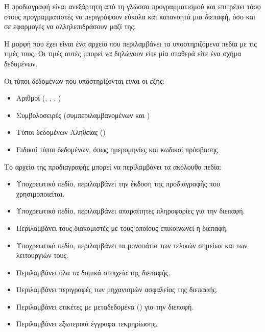Η προδιαγραφή  είναι ανεξάρτητη από τη γλώσσα προγραμματισμού και επιτρέπει 
τόσο στους προγραμματιστές να περιγράψουν εύκολα και κατανοητά μια διεπαφή, 
όσο και σε εφαρμογές να αλληλεπιδράσουν μαζί της.

Η μορφή που έχει είναι ένα αρχείο 
που περιλαμβάνει τα υποστηριζόμενα πεδία με τις τιμές τους.
Οι τιμές αυτές μπορεί να δηλώνουν είτε μία σταθερά είτε ένα σχήμα δεδομένων.

Οι τύποι δεδομένων που υποστηρίζονται είναι οι εξής:

\begin{itemize}
    \item Αριθμοί (, , , )
    \item Συμβολοσειρές (συμπεριλαμβανομένων  και )
    \item Tύποι δεδομένων Αληθείας ()
    \item Ειδικοί τύποι δεδομένων, όπως ημερομηνίες και κωδικοί πρόσβασης
\end{itemize}

Το αρχείο  της προδιαγραφής μπορεί να περιλαμβάνει τα ακόλουθα πεδία:

\begin{itemize}
    \item \underline{}
    
    Υποχρεωτικό πεδίο, περιλαμβάνει την έκδοση της προδιαγραφής  που χρησιμοποιείται.

    \item \underline{}
    
    Υποχρεωτικό πεδίο, περιλαμβάνει απαραίτητες πληροφορίες για την διεπαφή.

    \item \underline{}
    
    Περιλαμβάνει τους διακομιστές με τους οποίους επικοινωνεί η διεπαφή.

    \item \underline{}
    
    Υποχρεωτικό πεδίο, περιλαμβάνει τα μονοπάτια των τελικών σημείων και των λειτουργιών τους.
    
    \item \underline{}
    
    Περιλαμβάνει όλα τα δομικά στοιχεία της διεπαφής.
    
    \item \underline{}
    
    Περιλαμβάνει περιγραφές των μηχανισμών ασφαλείας της διεπαφής.

    \item \underline{}
    
    Περιλαμβάνει ετικέτες με μεταδεδομένα () για την διεπαφή.
    
    \item \underline{}
    
    Περιλαμβάνει εξωτερικά έγγραφα τεκμηρίωσης.
\end{itemize}


